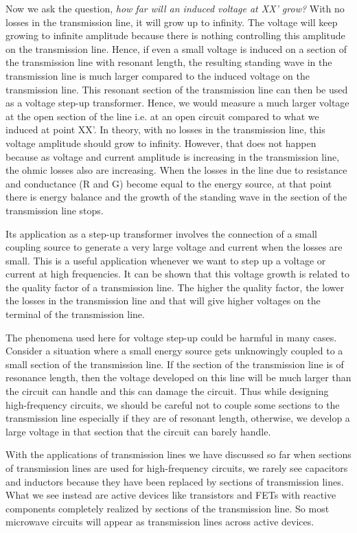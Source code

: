 Now we ask the question, \emph{how far will an induced voltage at XX' grow?} With no losses in the transmission line, it will grow up to infinity. The voltage will keep growing to infinite amplitude because there is nothing controlling this amplitude on the transmission line. Hence, if even a small voltage is induced on a section of the transmission line with resonant length, the resulting standing wave in the transmission line is much larger compared to the induced voltage on the transmission line. This resonant section of the transmission line can then be used as a voltage step-up transformer. Hence, we would measure a much larger voltage at the open section of the line i.e. at an open circuit compared to what we induced at point XX'. In theory, with no losses in the transmission line, this voltage amplitude should grow to infinity. However, that does not happen because as voltage and current amplitude is increasing in the transmission line, the ohmic losses also are increasing. When the losses in the line due to resistance and conductance (R and G) become equal to the energy source, at that point there is energy balance and the growth of the standing wave in the section of the transmission line stops.

Its application as a step-up transformer involves the connection of a small coupling source to generate a very large voltage and current when the losses are small. This is a useful application whenever we want to step up a voltage or current at high frequencies. It can be shown that this voltage growth is related to the quality factor of a transmission line. The higher the quality factor, the lower the losses in the transmission line and that will give higher voltages on the terminal of the transmission line.

The phenomena used here for voltage step-up could be harmful in many cases. Consider a situation where a small energy source gets unknowingly coupled to a small section of the transmission line. If the section of the transmission line is of resonance length, then the voltage developed on this line will be much larger than the circuit can handle and this can damage the circuit. Thus while designing high-frequency circuits, we should be careful not to couple some sections to the transmission line especially if they are of resonant length, otherwise, we develop a large voltage in that section that the circuit can barely handle. 

With the applications of transmission lines we have discussed so far when sections of transmission lines are used for high-frequency circuits, we rarely see capacitors and inductors because they have been replaced by sections of transmission lines. What we see instead are active devices like transistors and FETs with reactive components completely realized by sections of the transmission line. So most microwave circuits will appear as transmission lines across active devices.

